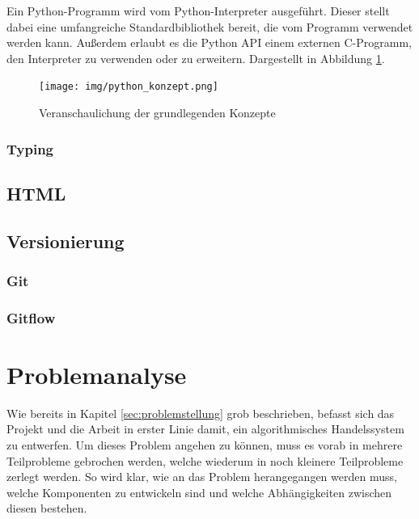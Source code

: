 \documentclass[oneside]{ausarbeitung}
\begin{document}
Ein Python-Programm wird vom Python-Interpreter ausgeführt. Dieser stellt dabei
eine umfangreiche Standardbibliothek bereit, die vom Programm verwendet werden
kann. Außerdem erlaubt es die Python API einem externen C-Programm, den
Interpreter zu verwenden oder zu erweitern. Dargestellt in Abbildung \ref{fig:5}.

\begin{figure}[H]
  \centering
  \texttt{[image: img/python\_konzept.png]}
  \caption{Veranschaulichung der grundlegenden Konzepte\cite{python_konzepte}}
  \label{fig:5}
\end{figure} 

\subsection{Typing}
\label{sub:typing}


\section{HTML}
\label{sec:html}


\section{Versionierung}
\label{sec:versionierung}

\subsection{Git}
\label{sub:git}

\subsection{Gitflow}
\label{sub:gitflow}

\chapter{Problemanalyse}
\label{cha:problemanalyse}

Wie bereits in Kapitel \ref{sec:problemstellung} grob beschrieben, befasst sich das Projekt und die Arbeit in erster Linie damit, ein algorithmisches Handelssystem zu entwerfen. Um dieses Problem angehen zu können, muss es vorab in mehrere Teilprobleme gebrochen werden, welche wiederum in noch kleinere Teilprobleme zerlegt werden. So wird klar, wie an das Problem herangegangen werden muss, welche Komponenten zu entwickeln sind und welche Abhängigkeiten zwischen diesen bestehen.
\end{document}
